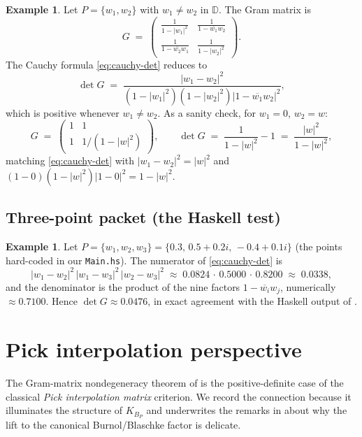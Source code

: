 \documentclass[12pt]{article}
\theoremstyle{definition}
\newtheorem{example}[theorem]{Example}
\theoremstyle{remark}
\newcommand{\D}{\mathbb{D}}
\newcommand{\KBP}{K_{B_{P}}}
\newcommand{\abs}[1]{\lvert #1 \rvert}
\newcommand{\conj}[1]{\overline{#1}}
\begin{document}
\begin{example}\label{ex:two}
Let $P=\{w_{1},w_{2}\}$ with $w_{1}\neq w_{2}$ in $\D$. The Gram matrix
is
\[
  G\;=\;\begin{pmatrix}
    \frac{1}{1-\abs{w_{1}}^{2}} & \frac{1}{1-\conj{w_{1}}w_{2}}\\[2pt]
    \frac{1}{1-\conj{w_{2}}w_{1}} & \frac{1}{1-\abs{w_{2}}^{2}}
  \end{pmatrix}.
\]
The Cauchy formula \eqref{eq:cauchy-det} reduces to
\[
  \det G\;=\;\frac{\abs{w_{1}-w_{2}}^{2}}
                  {(1-\abs{w_{1}}^{2})(1-\abs{w_{2}}^{2})\abs{1-\conj{w_{1}}w_{2}}^{2}},
\]
which is positive whenever $w_{1}\neq w_{2}$. As a sanity check, for
$w_{1}=0$, $w_{2}=w$:
\[
  G\;=\;\begin{pmatrix}1&1\\1&1/(1-\abs{w}^{2})\end{pmatrix},
   \qquad\det G\;=\;\frac{1}{1-\abs{w}^{2}}-1\;=\;\frac{\abs{w}^{2}}{1-\abs{w}^{2}},
\]
matching \eqref{eq:cauchy-det} with $\abs{w_{1}-w_{2}}^{2}=\abs{w}^{2}$
and $(1-0)(1-\abs{w}^{2})\abs{1-0}^{2}=1-\abs{w}^{2}$.
\end{example}

\subsection{Three-point packet (the Haskell test)}

\begin{example}\label{ex:three}
Let $P=\{w_{1},w_{2},w_{3}\}=\{0.3,\,0.5+0.2i,\,-0.4+0.1i\}$ (the points
hard-coded in our \texttt{Main.hs}). The numerator of \eqref{eq:cauchy-det}
is
\[
  \abs{w_{1}-w_{2}}^{2}\,\abs{w_{1}-w_{3}}^{2}\,\abs{w_{2}-w_{3}}^{2}
   \;\approx\;0.0824\,\cdot\,0.5000\,\cdot\,0.8200
   \;\approx\;0.0338,
\]
and the denominator is the product of the nine factors $1-\conj{w_{i}}w_{j}$,
numerically $\approx0.7100$. Hence $\det G\approx0.0476$, in exact
agreement with the Haskell output of .
\end{example}

\section{Pick interpolation perspective}\label{sec:pick}

The Gram-matrix nondegeneracy theorem of  is the
positive-definite case of the classical \emph{Pick interpolation
matrix} criterion. We record the connection because it illuminates the
structure of $\KBP$ and underwrites the remarks in 
about why the lift to the canonical Burnol/Blaschke factor is delicate.
\end{document}
